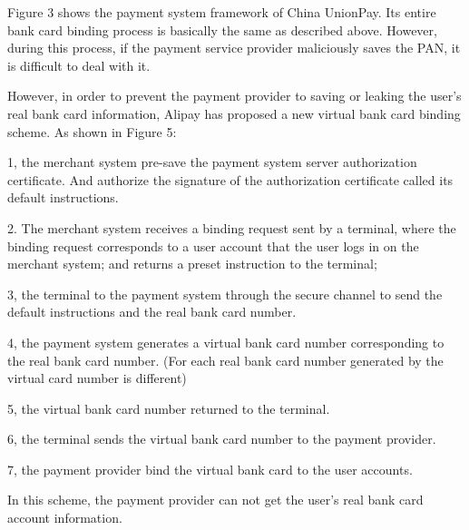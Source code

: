 \documentclass[journal]{IEEEtran}
\begin{document}
Figure 3 shows the payment system framework of China UnionPay. Its entire bank card binding process is basically the same as described above. However, during this process, if the payment service provider maliciously saves the PAN, it is difficult to deal with it.



However, in order to prevent the payment provider to saving or leaking the user's real bank card information, Alipay has proposed a new virtual bank card binding scheme. As shown in Figure 5:

1, the merchant system pre-save the payment system server authorization certificate. And authorize the signature of the authorization certificate called its default instructions.

2. The merchant system receives a binding request sent by a terminal, where the binding request corresponds to a user account that the user logs in on the merchant system; and returns a preset instruction to the terminal;

3, the terminal to the payment system through the secure channel to send the default instructions and the real bank card number.

4, the payment system generates a virtual bank card number corresponding to the real bank card number. (For each real bank card number generated by the virtual card number is different)

5, the virtual bank card number returned to the terminal.

6, the terminal sends the virtual bank card number to the payment provider.

7, the payment provider bind the virtual bank card to the user accounts.

In this scheme, the payment provider can not get the user's real bank card account information.
\end{document}
